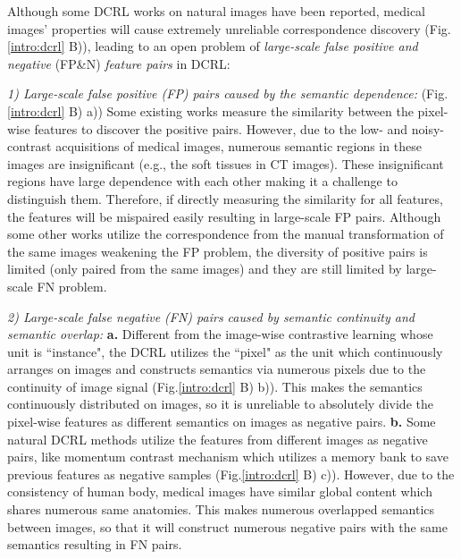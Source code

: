 Although some DCRL works \cite{li2021dense,o2020unsupervised,wang2022densecl,wang2022exploring,xie2021propagate} on natural images have been reported, medical images' properties will cause extremely unreliable correspondence discovery (Fig.\ref{intro:dcrl} B)), leading to an open problem of \emph{large-scale false positive and negative} (FP\&N) \emph{feature pairs} \cite{chuang2020debiased,chuang2022robust} in DCRL:

\emph{1) Large-scale false positive (FP) pairs caused by the semantic dependence:} (Fig.\ref{intro:dcrl} B) a)) Some existing works \cite{wang2022densecl,li2021dense} measure the similarity between the pixel-wise features to discover the positive pairs. However, due to the low- and noisy-contrast acquisitions \cite{zhou2019high} of medical images, numerous semantic regions in these images are insignificant (e.g., the soft tissues in CT images). These insignificant regions have large dependence with each other making it a challenge to distinguish them. Therefore, if directly measuring the similarity for all features, the features will be mispaired easily resulting in large-scale FP pairs. Although some other works \cite{o2020unsupervised,xie2021propagate,wang2022exploring} utilize the correspondence from the manual transformation of the same images weakening the FP problem, the diversity of positive pairs is limited (only paired from the same images) and they are still limited by large-scale FN problem.

\emph{2) Large-scale false negative (FN) pairs caused by semantic continuity and semantic overlap:} \textbf{a.} Different from the image-wise contrastive learning \cite{he2020momentum,chen2020simple,chen2020improved,grill2020bootstrap} whose unit is ``instance", the DCRL utilizes the ``pixel" as the unit which continuously arranges on images and constructs semantics via numerous pixels due to the continuity of image signal \cite{he2020momentum} (Fig.\ref{intro:dcrl} B) b)). This makes the semantics continuously distributed on images, so it is unreliable to absolutely divide the pixel-wise features as different semantics on images as negative pairs. \textbf{b.} Some natural DCRL methods \cite{wang2022densecl,li2021dense,wang2022exploring} utilize the features from different images as negative pairs, like momentum contrast mechanism \cite{He2020CVPR,wang2022densecl,li2021dense} which utilizes a memory bank to save previous features as negative samples (Fig.\ref{intro:dcrl} B) c)). However, due to the consistency of human body, medical images have similar global content which shares numerous same anatomies. This makes numerous overlapped semantics between images, so that it will construct numerous negative pairs with the same semantics resulting in FN pairs.

